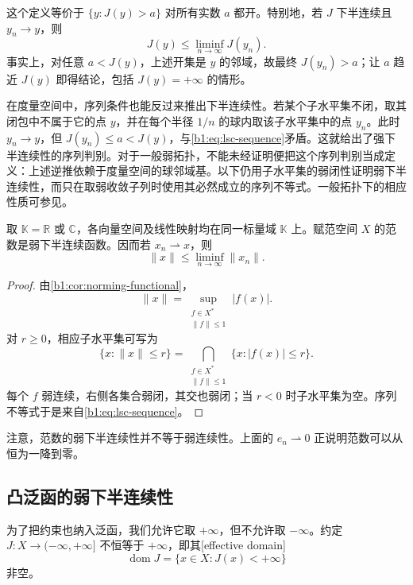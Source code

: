 这个定义等价于 \(\{y:J(y)>a\}\) 对所有实数 \(a\) 都开。特别地，若 \(J\) 下半连续且 \(y_n\to y\)，则
\begin{equation}
\label{b1:eq:lsc-sequence}
  J(y)\leq\liminf_{n\to\infty}J(y_n).
\end{equation}
事实上，对任意 \(a<J(y)\)，上述开集是 \(y\) 的邻域，故最终 \(J(y_n)>a\)；让 \(a\) 趋近 \(J(y)\) 即得结论，包括 \(J(y)=+\infty\) 的情形。

\ProseParagraphBreak

在度量空间中，序列条件也能反过来推出下半连续性。若某个子水平集不闭，取其闭包中不属于它的点 \(y\)，并在每个半径 \(1/n\) 的球内取该子水平集中的点 \(y_n\)。此时 \(y_n\to y\)，但 \(J(y_n)\leq a<J(y)\)，与\eqref{b1:eq:lsc-sequence}矛盾。这就给出了强下半连续性的序列判别。对于一般弱拓扑，不能未经证明便把这个序列判别当成定义：上述逆推依赖于度量空间的球邻域基。以下仍用子水平集的弱闭性证明弱下半连续性，而只在取弱收敛子列时使用其必然成立的序列不等式。一般拓扑下的相应性质可参见\cite[Volume 4, 4A2Bd]{Fremlin2016Measure}。

\begin{proposition}[范数的弱下半连续性]
\label{b1:prop:norm-weak-lsc}
取 \(\mathbb K=\mathbb R\) 或 \(\mathbb C\)，各向量空间及线性映射均在同一标量域 \(\mathbb K\) 上。赋范空间 \(X\) 的范数是弱下半连续函数。因而若 \(x_n\rightharpoonup x\)，则
\[
  \|x\|\leq\liminf_{n\to\infty}\|x_n\|.
\]
\end{proposition}

\begin{proof}
由\cref{b1:cor:norming-functional}，
\[
  \|x\|=\sup_{\substack{f\in X^*\\\|f\|\leq1}}|f(x)|.
\]
对 \(r\geq0\)，相应子水平集可写为
\[
  \{x:\|x\|\leq r\}
  =\bigcap_{\substack{f\in X^*\\\|f\|\leq1}}
    \{x:|f(x)|\leq r\}.
\]
每个 \(f\) 弱连续，右侧各集合弱闭，其交也弱闭；当 \(r<0\) 时子水平集为空。序列不等式于是来自\eqref{b1:eq:lsc-sequence}。
\end{proof}

注意，范数的弱下半连续性并不等于弱连续性。上面的 \(e_n\rightharpoonup0\) 正说明范数可以从恒为一降到零。

\subsection{凸泛函的弱下半连续性}
\label{b1:subsec:090504}

为了把约束也纳入泛函，我们允许它取 \(+\infty\)，但不允许取 \(-\infty\)。约定 \(J:X\to(-\infty,+\infty]\) 不恒等于 \(+\infty\)，即其[effective domain]
\[
  \operatorname{dom}J=\{x\in X:J(x)<+\infty\}
\]
非空。

